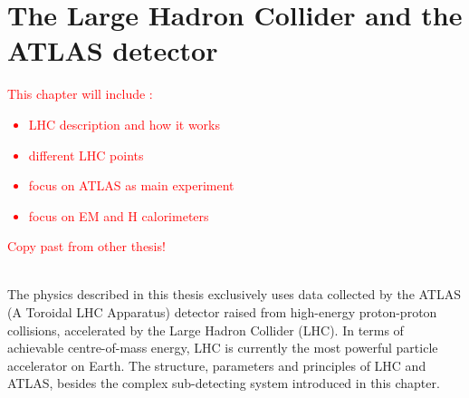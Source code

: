 \newpage
\chapter{The Large Hadron Collider and the ATLAS detector}
\label{LHC&ATLAS}
\textcolor{red}{ This chapter will include :
\begin{itemize}
    \item LHC description and how it works
    \item different LHC points 
    \item focus on ATLAS as main experiment
    \item focus on EM and H calorimeters 
\end{itemize}
Copy past from other thesis!
} \\
The physics described in this thesis exclusively uses data collected by the ATLAS (A Toroidal LHC Apparatus) detector raised from high-energy proton-proton collisions, accelerated by the Large Hadron Collider (LHC). In terms of achievable centre-of-mass energy, LHC is currently the most powerful particle accelerator on Earth. The structure, parameters and principles of LHC and ATLAS, besides the complex sub-detecting system introduced in this chapter.

